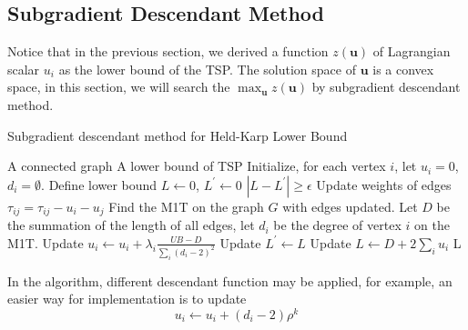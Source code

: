             \subsection{Subgradient Descendant Method}
                Notice that in the previous section, we derived a function $z(\mathbf{u})$ of Lagrangian scalar $u_i$ as the lower bound of the TSP. The solution space of $\mathbf{u}$ is a convex space, in this section, we will search the $\max_{\mathbf{u}} z(\mathbf{u})$ by subgradient descendant method.

                \begin{algorithm}
                    \caption{Subgradient descendant method for Held-Karp Lower Bound}
                    \begin{algorithmic}
                        \Require A connected graph
                        \Ensure A lower bound of TSP
                        \State Initialize, for each vertex $i$, let $u_i = 0$, $d_i = \emptyset$. Define lower bound $L \gets 0$, $L^\prime \gets 0$
                        \While $|L - L^\prime| \ge \epsilon$
                            \State Update weights of edges $\tau_{ij} = \tau_{ij} - u_i - u_j$
                            \State Find the M1T on the graph $G$ with edges updated. Let $D$ be the summation of the length of all edges, let $d_i$ be the degree of vertex $i$ on the M1T.
                            \State Update $u_i \gets u_i + \lambda_i \frac{UB - D}{\sum_i (d_i - 2)^2}$
                            \State Update $L^\prime \gets L$
                            \State Update $L \gets D + 2 \sum_i u_i$
                        \EndWhile
                        \State \Return L
                    \end{algorithmic}
                \end{algorithm}

                In the algorithm, different descendant function may be applied, for example, an easier way for implementation is to update
                \begin{equation*}
                    u_i \gets u_i + (d_i - 2) \rho^k
                \end{equation*}


